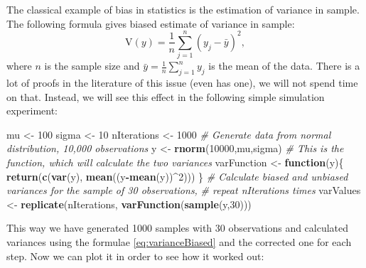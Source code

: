 \documentclass[
]{book}
\newenvironment{Shaded}{\begin{snugshade}}{\end{snugshade}}
\newcommand{\CommentTok}[1]{\textcolor[rgb]{0.56,0.35,0.01}{\textit{#1}}}
\newcommand{\ControlFlowTok}[1]{\textcolor[rgb]{0.13,0.29,0.53}{\textbf{#1}}}
\newcommand{\DecValTok}[1]{\textcolor[rgb]{0.00,0.00,0.81}{#1}}
\newcommand{\KeywordTok}[1]{\textcolor[rgb]{0.13,0.29,0.53}{\textbf{#1}}}
\newcommand{\NormalTok}[1]{#1}
\newcommand{\OperatorTok}[1]{\textcolor[rgb]{0.81,0.36,0.00}{\textbf{#1}}}
\newcommand{\StringTok}[1]{\textcolor[rgb]{0.31,0.60,0.02}{#1}}
\theoremstyle{definition}
\theoremstyle{definition}
\theoremstyle{definition}
\theoremstyle{definition}
\theoremstyle{remark}
\begin{document}
The classical example of bias in statistics is the estimation of variance in sample. The following formula gives biased estimate of variance in sample:
\begin{equation}
    \mathrm{V}(y) = \frac{1}{n} \sum_{j=1}^n \left( y_j - \bar{y} \right)^2,
    \label{eq:varianceBiased}
\end{equation}
where \(n\) is the sample size and \(\bar{y} = \frac{1}{n} \sum_{j=1}^n y_j\) is the mean of the data. There is a lot of proofs in the literature of this issue (even \citet{WikipediaVarianceBias2020} has one), we will not spend time on that. Instead, we will see this effect in the following simple simulation experiment:

\begin{Shaded}
\begin{Highlighting}[]
\NormalTok{mu \textless{}{-}}\StringTok{ }\DecValTok{100}
\NormalTok{sigma \textless{}{-}}\StringTok{ }\DecValTok{10}
\NormalTok{nIterations \textless{}{-}}\StringTok{ }\DecValTok{1000}
\CommentTok{\# Generate data from normal distribution, 10,000 observations}
\NormalTok{y \textless{}{-}}\StringTok{ }\KeywordTok{rnorm}\NormalTok{(}\DecValTok{10000}\NormalTok{,mu,sigma)}
\CommentTok{\# This is the function, which will calculate the two variances}
\NormalTok{varFunction \textless{}{-}}\StringTok{ }\ControlFlowTok{function}\NormalTok{(y)\{}
   \KeywordTok{return}\NormalTok{(}\KeywordTok{c}\NormalTok{(}\KeywordTok{var}\NormalTok{(y), }\KeywordTok{mean}\NormalTok{((y}\OperatorTok{{-}}\KeywordTok{mean}\NormalTok{(y))}\OperatorTok{\^{}}\DecValTok{2}\NormalTok{)))}
\NormalTok{\}}
\CommentTok{\# Calculate biased and unbiased variances for the sample of 30 observations,}
\CommentTok{\# repeat nIterations times}
\NormalTok{varValues \textless{}{-}}\StringTok{ }\KeywordTok{replicate}\NormalTok{(nIterations, }\KeywordTok{varFunction}\NormalTok{(}\KeywordTok{sample}\NormalTok{(y,}\DecValTok{30}\NormalTok{)))}
\end{Highlighting}
\end{Shaded}

This way we have generated 1000 samples with 30 observations and calculated variances using the formulae \eqref{eq:varianceBiased} and the corrected one for each step. Now we can plot it in order to see how it worked out:
\end{document}
